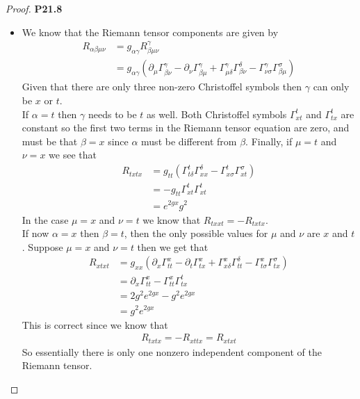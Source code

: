 \documentclass[11pt]{article}
\theoremstyle{definition}
\begin{document}
\begin{proof}{\textbf{P21.8}}
\begin{itemize}
\item [\textbf{c.}] We know that the Riemann tensor components are given by
\begin{align*}
    R_{\alpha\beta\mu\nu} &= g_{\alpha\gamma}R^\gamma_{\beta\mu\nu} \\
    &= g_{\alpha\gamma}
    (\partial_\mu \Gamma^\gamma_{\beta\nu}
    - \partial_\nu \Gamma^\gamma_{\beta\mu}
    + \Gamma^\gamma_{\mu\delta}\Gamma^\delta_{\beta\nu}
    - \Gamma^\gamma_{\nu\sigma}\Gamma^\sigma_{\beta\mu}
    )
\end{align*}
Given that there are only three non-zero Christoffel symbols then $\gamma$
can only be $x$ or $t$.\\
If $\alpha = t$ then $\gamma$ needs to be $t$ as well. Both Christoffel
symbols $\Gamma^t_{xt}$ and $\Gamma^t_{tx}$ are constant so the first two
terms in the Riemann tensor equation are zero, and must be that
$\beta = x$ since $\alpha$ must be different from $\beta$.
Finally, if $\mu = t$ and $\nu = x$ we see that
\begin{align*}
    R_{txtx}
    &= g_{tt}(\Gamma^t_{t\delta}\Gamma^\delta_{xx}
    - \Gamma^t_{x\sigma}\Gamma^\sigma_{xt})\\
    &= -g_{tt}\Gamma^t_{xt}\Gamma^t_{xt}\\
    &= e^{2gx}g^2
\end{align*}
In the case $\mu = x$ and $\nu = t$ we know that $R_{txxt} = - R_{txtx}$.\\
If now $\alpha = x$ then $\beta = t$, then the only possible values for $\mu$
and $\nu$ are $x$ and $t$. Suppose $\mu = x$ and $\nu = t$ then we get that
\begin{align*}
    R_{xtxt}
    &= g_{xx}
    (\partial_x \Gamma^x_{tt}
    - \partial_t \Gamma^x_{tx}
    + \Gamma^x_{x\delta}\Gamma^\delta_{tt}
    - \Gamma^x_{t\sigma}\Gamma^\sigma_{tx}
    )\\
    &=\partial_x \Gamma^x_{tt} - \Gamma^x_{tt}\Gamma^t_{tx} \\
    &=2g^2e^{2gx} - g^2e^{2gx} \\
    &=g^2e^{2gx}
\end{align*}
This is correct since we know that
\begin{align*}
    R_{txtx} = -R_{xttx} = R_{xtxt} 
\end{align*}
So essentially there is only one nonzero independent component of the Riemann
tensor.


\end{itemize}
\end{proof}
\end{document}
